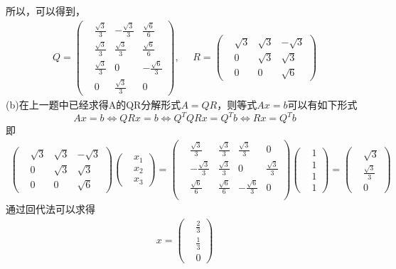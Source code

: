 \documentclass[UTF8,12pt, a4paper]{ctexart}
\begin{document}
所以，可以得到，
\begin{align*}
  Q=\left(
  \begin{matrix}
    &\frac{\sqrt{3}}{3} & -\frac{\sqrt{3}}{3} &\frac{\sqrt{6}}{6}\\
    &\frac{\sqrt{3}}{3} & \frac{\sqrt{3}}{3} & \frac{\sqrt{6}}{6}\\
    &\frac{\sqrt{3}}{3} & 0 & -\frac{\sqrt{6}}{3}\\
    &0 & \frac{\sqrt{3}}{3} & 0
  \end{matrix}  
  \right), \ \ \ \ \ \ 
  R=\left(
    \begin{matrix}
      & \sqrt{3} & \sqrt{3} & -\sqrt{3} \\
      & 0 &\sqrt{3} & \sqrt{3} \\
      & 0 & 0 & \sqrt{6}
    \end{matrix}
  \right)
\end{align*}
(b)在上一题中已经求得A的QR分解形式$A=QR$，则等式$Ax=b$可以有如下形式
$$
Ax=b \Leftrightarrow QRx=b \Leftrightarrow Q^TQRx=Q^Tb \Leftrightarrow Rx=Q^Tb
$$
即
\begin{align*}
  \left(
    \begin{matrix}
      & \sqrt{3} & \sqrt{3} & -\sqrt{3} \\
      & 0 &\sqrt{3} & \sqrt{3} \\
      & 0 & 0 & \sqrt{6}
    \end{matrix}
  \right)
  \left(\begin{matrix}
    & x_1 \\
    & x_2 \\
    & x_3
  \end{matrix}
\right)
= \left(
  \begin{matrix}
    &\frac{\sqrt{3}}{3} & \frac{\sqrt{3}}{3} &\frac{\sqrt{3}}{3} & 0 \\
    &-\frac{\sqrt{3}}{3} & \frac{\sqrt{3}}{3} & 0 & \frac{\sqrt{3}}{3} \\
    &\frac{\sqrt{6}}{6} & \frac{\sqrt{6}}{6} & -\frac{\sqrt{6}}{3} & 0 \\
  \end{matrix}  
\right)
\left(\begin{matrix}
  & 1 \\
  & 1 \\
  & 1 \\
  & 1
\end{matrix}
\right)
=\left(
  \begin{matrix}
    & \sqrt{3} \\
    & \frac{\sqrt{3}}{3} \\
    & 0
  \end{matrix}  
\right)
\end{align*}
通过回代法可以求得
\begin{align*}
  x=\left(
    \begin{matrix}
      & \frac{2}{3} \\
      & \frac{1}{3} \\
      & 0
    \end{matrix}
  \right)
\end{align*}
\end{document}
